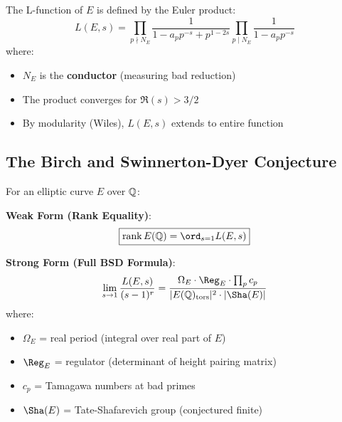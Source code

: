 \begin{defn}\label{def:l-function-elliptic}
The L-function of $E$ is defined by the Euler product\cite{silverman1986arithmetic}:
\begin{equation}
L(E,s) = \prod_{p \nmid N_E} \frac{1}{1 - a_p p^{-s} + p^{1-2s}} \prod_{p \mid N_E} \frac{1}{1 - a_p p^{-s}}
\end{equation}
where:
\begin{itemize}
\item $N_E$ is the \textbf{conductor} (measuring bad reduction)
\item The product converges for $\Re(s) > 3/2$
\item By modularity (Wiles\cite{wiles1995modular}), $L(E,s)$ extends to entire function
\end{itemize}
\end{defn}

\subsection{The Birch and Swinnerton-Dyer Conjecture}

\begin{conjecture}\label{conj:bsd}
For an elliptic curve $E$ over $\mathbb{Q}$:

\textbf{Weak Form (Rank Equality)}:
\begin{equation}
\boxed{\rank E(\Q) = \ord_{s=1} L(E,s)}
\end{equation}

\textbf{Strong Form (Full BSD Formula)}:
\begin{equation}
\lim_{s \to 1} \frac{L(E,s)}{(s-1)^r} = \frac{\Omega_E \cdot \Reg_E \cdot \prod_p c_p}{|E(\Q)_{\text{tors}}|^2 \cdot |\Sha(E)|}
\end{equation}
where:
\begin{itemize}
\item $\Omega_E$ = real period (integral over real part of $E$)
\item $\Reg_E$ = regulator (determinant of height pairing matrix)
\item $c_p$ = Tamagawa numbers at bad primes
\item $\Sha(E)$ = Tate-Shafarevich group (conjectured finite)
\end{itemize}
\end{conjecture}

